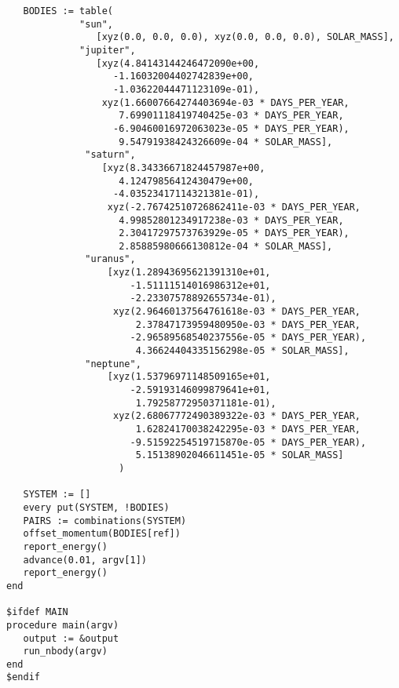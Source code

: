 \documentclass[letterpaper,12pt]{article}
\begin{document}
\begin{verbatim}
   BODIES := table(
             "sun",
                [xyz(0.0, 0.0, 0.0), xyz(0.0, 0.0, 0.0), SOLAR_MASS],
             "jupiter",
                [xyz(4.84143144246472090e+00,
                   -1.16032004402742839e+00,
                   -1.03622044471123109e-01),
                 xyz(1.66007664274403694e-03 * DAYS_PER_YEAR,
                    7.69901118419740425e-03 * DAYS_PER_YEAR,
                   -6.90460016972063023e-05 * DAYS_PER_YEAR),
                    9.54791938424326609e-04 * SOLAR_MASS],
              "saturn",
                 [xyz(8.34336671824457987e+00,
                    4.12479856412430479e+00,
                   -4.03523417114321381e-01),
                  xyz(-2.76742510726862411e-03 * DAYS_PER_YEAR,
                    4.99852801234917238e-03 * DAYS_PER_YEAR,
                    2.30417297573763929e-05 * DAYS_PER_YEAR),
                    2.85885980666130812e-04 * SOLAR_MASS],
              "uranus",
                  [xyz(1.28943695621391310e+01,
                      -1.51111514016986312e+01,
                      -2.23307578892655734e-01),
                   xyz(2.96460137564761618e-03 * DAYS_PER_YEAR,
                       2.37847173959480950e-03 * DAYS_PER_YEAR,
                      -2.96589568540237556e-05 * DAYS_PER_YEAR),
                       4.36624404335156298e-05 * SOLAR_MASS],
              "neptune",
                  [xyz(1.53796971148509165e+01,
                      -2.59193146099879641e+01,
                       1.79258772950371181e-01),
                   xyz(2.68067772490389322e-03 * DAYS_PER_YEAR,
                       1.62824170038242295e-03 * DAYS_PER_YEAR,
                      -9.51592254519715870e-05 * DAYS_PER_YEAR),
                       5.15138902046611451e-05 * SOLAR_MASS]
                    )

   SYSTEM := []
   every put(SYSTEM, !BODIES)
   PAIRS := combinations(SYSTEM)
   offset_momentum(BODIES[ref])
   report_energy()
   advance(0.01, argv[1])
   report_energy()
end

$ifdef MAIN
procedure main(argv)
   output := &output
   run_nbody(argv)
end
$endif

\end{verbatim}

\newpage
\end{document}

